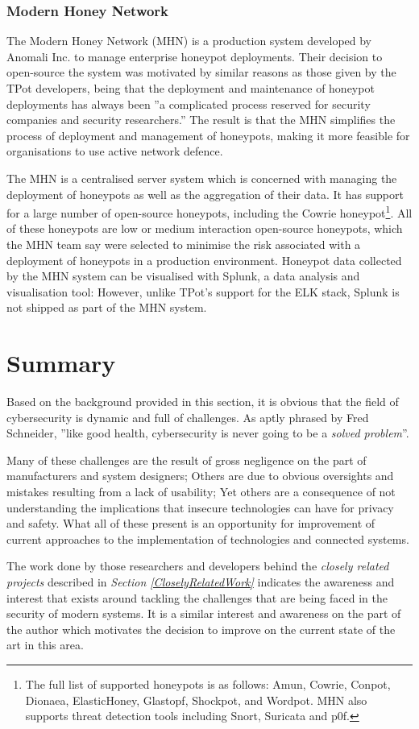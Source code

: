     \subsubsection{Modern Honey Network} \label{AboutMHN}
    The Modern Honey Network (MHN) is a production system developed by Anomali Inc. to manage enterprise honeypot deployments. Their decision to open-source the system was motivated by similar reasons as those given by the TPot developers, being that the deployment and maintenance of honeypot deployments has always been ''a complicated process reserved for security companies and security researchers.'' \cite{ModernHoneyNetworkLaunchAnnouncement} The result is that the MHN simplifies the process of deployment and management of honeypots, making it more feasible for organisations to use active network defence.
    
    The MHN is a centralised server system which is concerned with managing the deployment of honeypots as well as the aggregation of their data. It has support for a large number of open-source honeypots, including the Cowrie honeypot\footnote{The full list of supported honeypots is as follows: Amun, Cowrie, Conpot, Dionaea, ElasticHoney, Glastopf, Shockpot, and Wordpot. MHN also supports threat detection tools including Snort, Suricata and p0f.}. All of these honeypots are low or medium interaction open-source honeypots, which the MHN team say were selected to minimise the risk associated with a deployment of honeypots in a production environment. Honeypot data collected by the MHN system can be visualised with Splunk, a data analysis and visualisation tool: However, unlike TPot's support for the ELK stack, Splunk is not shipped as part of the MHN system.

    
\section{Summary} \label{SoASummary}
Based on the background provided in this section, it is obvious that the field of cybersecurity is dynamic and full of challenges. As aptly phrased by Fred Schneider, ''like good health, cybersecurity is never going to be a \textit{solved problem}''. 

Many of these challenges are the result of gross negligence on the part of manufacturers and system designers; Others are due to obvious oversights and mistakes resulting from a lack of usability; Yet others are a consequence of not understanding the implications that insecure technologies can have for privacy and safety. What all of these present is an opportunity for improvement of current approaches to the implementation of technologies and connected systems.

The work done by those researchers and developers behind the \textit{closely related projects} described in \textit{Section \ref{CloselyRelatedWork}} indicates the awareness and interest that exists around tackling the challenges that are being faced in the security of modern systems. It is a similar interest and awareness on the part of the author which motivates the decision to improve on the current state of the art in this area.

